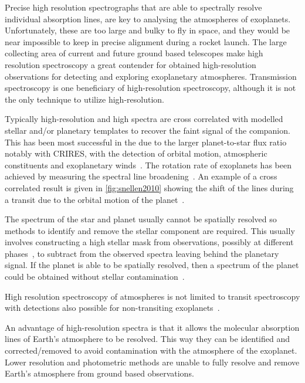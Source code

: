 Precise high resolution spectrographs that are able to spectrally resolve individual absorption lines, are key to analysing the atmospheres of exoplanets.
Unfortunately, these are too large and bulky to fly in space, and they would be near impossible to keep in precise alignment during a rocket launch.
The large collecting area of current and future ground based telescopes make high resolution spectroscopy a great contender for obtained high-resolution observations for detecting and exploring exoplanetary atmospheres.
Transmission spectroscopy is one beneficiary of high-resolution spectroscopy, although it is not the only technique to utilize high-resolution.

Typically high-resolution and high \snr{} spectra are cross correlated with modelled stellar and/or planetary templates to recover the faint signal of the companion.
This has been most successful in the \nir{} due to the larger planet-to-star flux ratio
notably with CRIRES, with the detection of orbital motion, atmospheric constituents and exoplanetary winds~\citep[e.g.][]{snellen_orbital_2010, dekok_detection_2013, brogi_carbon_2014, brogi_rotation_2016, schwarz_evidence_2015}.
The rotation rate of exoplanets has been achieved by measuring the spectral line broadening~\citep{snellen_fast_2014, brogi_rotation_2016}.
An example of a cross correlated result is given in \cref{fig:snellen2010} showing the shift of the  lines during a transit due to the orbital motion of the planet~\citep{snellen_orbital_2010}.

The spectrum of the star and planet usually cannot be spatially resolved so methods to identify and remove the stellar component are required.
This usually involves constructing a high \snr{} stellar mask from observations, possibly at different phases~\citep[e.g.][]{rodler_weighing_2012}, to subtract from the observed spectra leaving behind the planetary signal.
If the planet is able to be spatially resolved, then a spectrum of the planet could be obtained without stellar contamination~\citep[e.g.][]{snellen_combining_2015}.

High resolution spectroscopy of atmospheres is not limited to transit spectroscopy with detections also possible for non-transiting exoplanets~\citep[e.g.][]{brogi_signature_2012, brogi_carbon_2014,lockwood_nearir_2014, piskorz_evidence_2016}.

An advantage of high-resolution spectra is that it allows the molecular absorption lines of Earth's atmosphere to be resolved.
This way they can be identified and corrected/removed to avoid contamination with the atmosphere of the exoplanet.
Lower resolution and photometric methods are unable to fully resolve and remove Earth's atmosphere from ground based observations.


